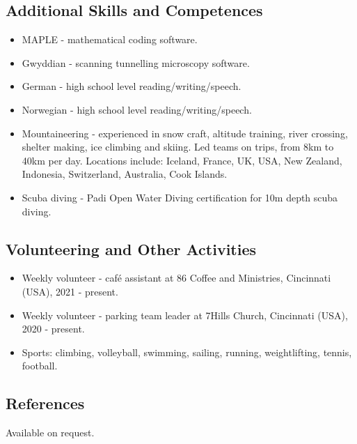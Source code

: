 \documentclass[12pt,]{scrartcl}
\begin{document}
\subsection{Additional Skills and Competences}\label{additional-skills-competences}
\begin{itemize}
  \leftskip-0.25in
    \item MAPLE - mathematical coding software.
    \item Gwyddian - scanning tunnelling microscopy software.
    \item German - high school level reading/writing/speech. 
    \item Norwegian - high school level reading/writing/speech. 
    \item Mountaineering - experienced in snow craft, altitude training, river crossing, shelter making, ice climbing and skiing. Led teams on trips, from 8km to 40km per day. Locations include: Iceland, France, UK, USA, New Zealand, Indonesia, Switzerland, Australia, Cook Islands.
    \item Scuba diving - Padi Open Water Diving certification for 10m depth scuba diving. 

\end{itemize}

\subsection{Volunteering and Other Activities}\label{volunteering-other-activities}

\begin{itemize}
  \leftskip-0.25in
  \item Weekly volunteer - caf\'{e} assistant at 86 Coffee and Ministries, Cincinnati (USA), 2021 - present.
  \item Weekly volunteer - parking team leader at 7Hills Church, Cincinnati (USA), 2020 - present.
  \item Sports: climbing, volleyball, swimming, sailing, running, weightlifting, tennis, football.
\end{itemize}

%

\subsection{References}\label{references}

Available on request.

\newpage
\end{document}
